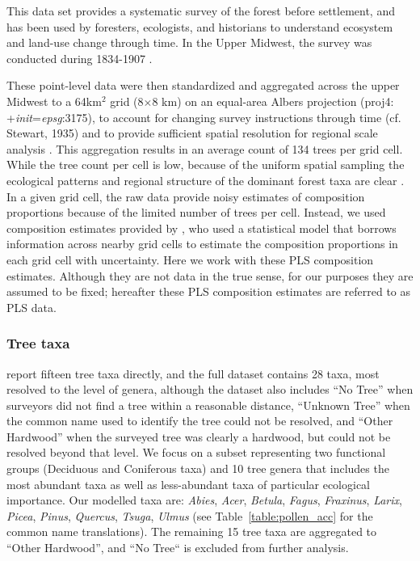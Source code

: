 \documentclass[12pt]{article}
\begin{document}
This data set provides a systematic survey of the forest
before settlement, and has been used by foresters, ecologists, and
historians to understand ecosystem and land-use change through
time. In the Upper Midwest, the survey was conducted during 1834-1907
\citep{stewart1935public}. 

These point-level data were then standardized and aggregated across
the upper Midwest to a 64km$^2$ grid (8$\times$8 km) on an equal-area
Albers projection (proj4: +\textit{init}=\textit{epsg}:3175), to
account for changing survey instructions through time (cf. Stewart,
1935) and to provide sufficient spatial resolution for regional scale
analysis \citep{goring_witness}.  This aggregation results in an
average count of 134 trees per grid cell. While the tree count per
cell is low, because of the uniform spatial sampling the ecological
patterns and regional structure of the dominant forest taxa are clear
\citep{goring_witness}. In a given grid cell, the raw data provide
noisy estimates of composition proportions because of the limited
number of trees per cell. Instead, we used composition estimates
provided by \citet{paciorek2015}, who used a statistical model that
borrows information across nearby grid cells to estimate the
composition proportions in each grid cell with uncertainty. Here we
work with these PLS composition estimates. Although they are not data
in the true sense, for our purposes they are assumed to be fixed;
hereafter these PLS composition estimates are referred to as PLS data.

\subsubsection{Tree taxa}

\citet{goring_witness} report fifteen tree taxa directly, and the full
dataset contains 28 taxa, most resolved to the level of genera,
although the dataset also includes ``No Tree'' when surveyors did not
find a tree within a reasonable distance, ``Unknown Tree'' when the
common name used to identify the tree could not be resolved, and
``Other Hardwood'' when the surveyed tree was clearly a hardwood, but
could not be resolved beyond that level. We focus on a subset
representing two functional groups (Deciduous and Coniferous taxa) and
10 tree genera that includes the most abundant taxa as well as
less-abundant taxa of particular ecological importance. Our modelled
taxa are: \textit{Abies}, \textit{Acer}, \textit{Betula},
\textit{Fagus}, \textit{Fraxinus}, \textit{Larix}, \textit{Picea},
\textit{Pinus}, \textit{Quercus}, \textit{Tsuga}, \textit{Ulmus} (see
Table~\ref{table:pollen_acc} for the common name translations). The
remaining 15 tree taxa are aggregated to ``Other Hardwood'', and ``No
Tree`` is excluded from further analysis. 
\end{document}
